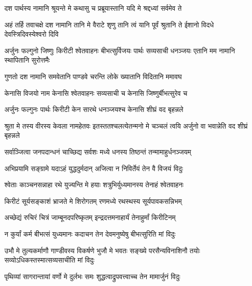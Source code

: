 


\twolineshloka
{दश पार्थस्य नामानि श्रूयन्ते मे कथासु च}
{प्रब्रूयास्तानि यदि मे श्रद्दध्यां सर्वमेव ते}




\threelineshloka
{अहं तर्हि तवाचक्षे दश नामानि तानि मे}
{वैराटे शृणु तानि त्वं यानि पूर्वं श्रुतानि ते}
{ईशानो विदधे देवस्त्रिदिवस्येश्वरो दिवि}


\threelineshloka
{अर्जुनः फल्गुनो जिष्णुः किरीटी श्वेतवाहनः}
{बीभत्सुर्विजयः पार्थः सव्यसाची धनञ्जयः}
{एतानि मम नामानि स्थापितानि सुरोत्तमैः}




\twolineshloka
{गुणतो दश नामानि समवेतानि पाण्डवे}
{चरन्ति लोके ख्यातानि विदितानि ममावघ}


\twolineshloka
{केनासि विजयो नाम केनासि श्वेतवाहनः}
{सव्यसाची च केनासि जिष्णुर्बीभत्सुरेव च}


\twolineshloka
{अर्जुनः फल्गुनः पार्थः किरीटी केन सारथे}
{धनञ्जयश्च केनासि शीघ्रं वद बृहन्नले}


\threelineshloka
{श्रुता मे तस्य वीरस्य केवला नामहेतवः}
{इतस्ततश्चलत्येतन्मनो मे चञ्चलं त्वयि}
{अर्जुनो वा भवान्नेति वद शीघ्रं बृहन्नले}




\twolineshloka
{सर्वाञ्जित्वा जनपदान्धनं चाच्छिद्य सर्वशः}
{मध्ये धनस्य तिष्ठन्तं तन्मामाहुर्धनञ्जयम्}


\twolineshloka
{अभिप्रयामि सङ्ग्रामे यदाऽहं युद्धदुर्मदान्}
{अजित्वा न निविर्तेयं तेन वै विजयं विदुः}


\twolineshloka
{श्वेताः काञ्चनसन्नाहा रथे युज्यन्ति मे हयाः}
{शत्रुभिर्युध्यमानस्य तेनाहं श्वेतवाहनः}


\twolineshloka
{किरीटं सूर्यसङ्काशं भ्राजते मे शिरोगतम्}
{रणमध्ये रथस्थस्य सूर्यपावकसन्निभम्}


\twolineshloka
{अच्छेद्यं रुचिरं चित्रं जाम्बूनदपरिष्कृतम्}
{इन्द्रदत्तमनाहार्यं तेनाहुर्मां किरीटिनम्}


\twolineshloka
{न कुर्यां कर्म बीभत्सं युध्यमानः कदाचन}
{तेन देवमनुष्येषु बीभत्सुरिति मां विदुः}


\threelineshloka
{उभौ मे तुल्यकर्माणौ गाण्डीवस्य विकर्षणे}
{भुजौ मे भवतः सङ्ख्ये परसैन्यविनाशिनौ}
{तयोः सव्योऽधिकस्तस्मात्सव्यसाचीति मां विदुः}


\twolineshloka
{पृथिव्यां सागरान्तायां वर्णो मे दुर्लभः समः}
{शुद्धत्वाद्रुपवत्त्वाच्च तेन मामार्जुनं विदुः}


